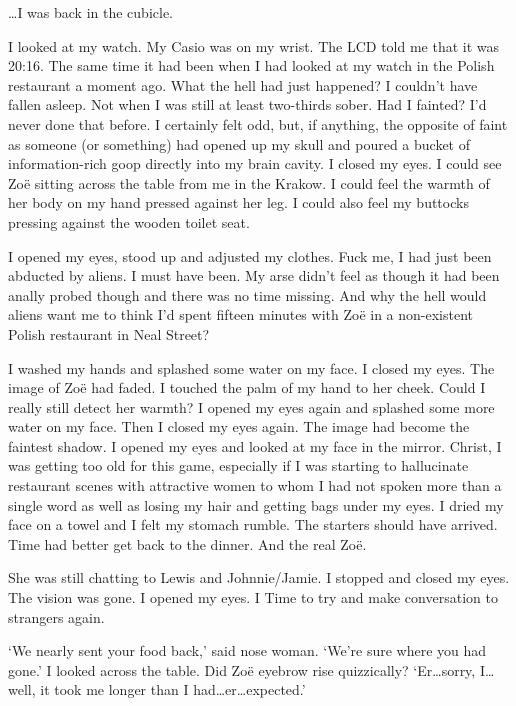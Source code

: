 \vskip 1cm

{\parindent=0pt
{\dots}I was back in the cubicle.}

I looked at my watch. My Casio was on my wrist. The LCD told me that it was 20:16. The same time it had been when I had looked at my watch in the Polish restaurant a moment ago. What the hell had just happened? I couldn't have fallen asleep. Not when I was
still at least two-thirds sober. Had I fainted? I'd
never done that before. I certainly felt odd, but, if anything, the
opposite of faint as someone (or something) had opened up my skull
and poured a bucket of information-rich goop directly into my brain
cavity. I closed my eyes. I could see Zo{\"e} sitting across the table from me in the Krakow. I could feel the warmth of her body on my hand pressed against her leg. I could also feel my buttocks
pressing against the wooden toilet seat.

I opened my eyes, stood up and adjusted my clothes. Fuck me, I had just been abducted by aliens. I must have been. My arse didn't feel as though it had been anally probed though and there was no time missing. And why the hell would aliens want me to think I'd spent fifteen minutes with Zo{\"e} in a non-existent Polish restaurant in Neal Street?

I washed my
hands and splashed some water on my face. I closed my eyes. The
image of Zo{\"e} had faded. I touched the palm of my hand to her cheek. Could I really still detect her warmth? I opened my eyes again and splashed some more
water on my face. Then I closed my eyes again. The image had become the
faintest shadow. I opened my eyes and looked at my
face in the mirror. Christ, I was getting too old for this game, especially if I was starting to hallucinate restaurant scenes with attractive women to whom I had not spoken more than a single word as well as losing my hair and getting bags under my eyes. I dried my face on a towel
and I felt my stomach rumble. The starters should have arrived. Time had better get back to the
dinner. And the real Zo{\"e}.

She was still chatting to Lewis and Johnnie/Jamie. I stopped and closed my eyes. The vision was gone. I opened my eyes. I Time to try and make
conversation to strangers again.

`We nearly sent your food back,' said nose woman. `We're sure where you had gone.' I looked across the table. Did Zo{\"e} eyebrow rise quizzically? `Er\dots sorry, I\dots well, it took me longer than I had\dots er\dots expected.'


